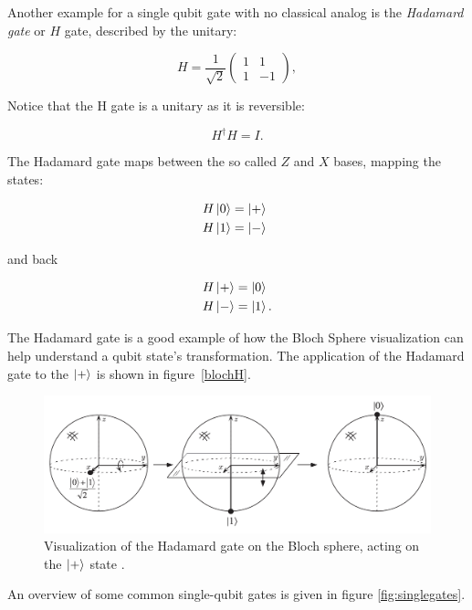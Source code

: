 Another example for a single qubit gate with no classical analog is the
\textit{Hadamard gate} or $H$ gate, described by the unitary:

\begin{equation}
  H = \frac{1}{\sqrt{2}}
  \begin{pmatrix}
    1 & 1 \\
    1 & -1
  \end{pmatrix},
\end{equation}

Notice that the H gate is a unitary as it is reversible:

\begin{equation}
   H^{\dagger} H = I.
\end{equation}

The Hadamard gate maps between the so called $Z$ and $X$ bases, mapping the
states:

\begin{align}
  H \Ket{0} &= \Ket{+} \\
  H \Ket{1} &= \Ket{-} \phantom{.}
\end{align}

and back

\begin{align}
  H \Ket{+} &= \Ket{0} \\
  H \Ket{-} &= \Ket{1}.
\end{align}

The Hadamard gate is a good example of how the Bloch Sphere visualization can help understand a qubit state's transformation. The application of the Hadamard gate to the $\Ket{+}$ is shown in figure~\ref{blochH}.

\begin{figure}[H]
  \centering
  \label{fig:blochH}
  \includegraphics[width=\textwidth]{figures/hadamard}
  \caption[Hadamard Visualization]{Visualization of the Hadamard gate on the Bloch sphere, acting on the $\Ket{+}$ state \cite{nielsen2002quantum}.}
\end{figure}

An overview of some common single-qubit gates is given in figure \ref{fig:singlegates}.

